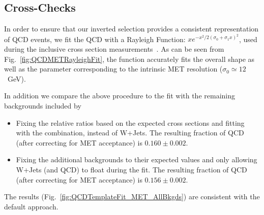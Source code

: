 



\subsection{Cross-Checks}

In order to ensure that our inverted selection provides a consistent representation of
QCD events,
we fit the QCD with a Rayleigh Function: $xe^{-x^2/2(\sigma_0+\sigma_1x)^2}$,
used during the inclusive cross section measurements~\cite{WZCMS:2010}.
As can be seen from Fig.~\ref{fig:QCDMETRayleighFit},
the function accurately fits the overall shape as well as the parameter
corresponding to the intrinsic MET resolution ($\sigma_0\simeq 12$~GeV).

In addition we compare the above procedure to the fit with the remaining backgrounds included by
\begin{itemize}
\item Fixing the relative ratios based on the expected cross sections and fitting with the combination, instead of W+Jets. The resulting fraction of QCD (after correcting for MET acceptance) is $0.160\pm 0.002$.
\item Fixing the additional backgrounds to their expected values and only allowing W+Jets (and QCD) to float during the fit. The resulting fraction of QCD (after correcting for MET acceptance) is $0.156\pm 0.002$.
\end{itemize}
The results (Fig.~\ref{fig:QCDTemplateFit_MET_AllBkgds}) are consistent with the default approach.

